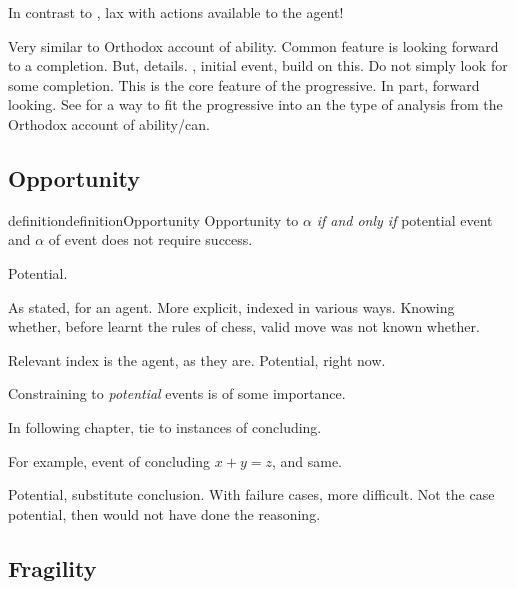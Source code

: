 \begin{note}
  In contrast to \citeauthor{Boylan:2020aa}, lax with actions available to the agent!

  Very similar to Orthodox account of ability.
  Common feature is looking forward to a completion.
  But, details.
  \citeauthor{Landman:1992wh}, initial event, build on this.
  Do not simply look for some completion.
  This is the core feature of the progressive.
  In part, forward looking.
  See \textcite{Portner:1998um} for a way to fit the progressive into an the type of analysis from the Orthodox account of ability/can.
\end{note}

\subsection{Opportunity}
\label{sec:potential}


\begin{note}
  \begin{restatable}[Opportunity]{definition}{definitionOpportunity}
    Opportunity to \(\alpha\) \emph{if and only if} potential event and \(\alpha\) of event does not require success.
  \end{restatable}
\end{note}

\begin{note}
  Potential.

  As stated, for an agent.
  More explicit, indexed in various ways.
  Knowing whether, before learnt the rules of chess, valid move was not known whether.

  Relevant index is the agent, as they are.
  Potential, right now.
\end{note}

\begin{note}[Importance]
  Constraining  to \emph{potential} events is of some importance.

  In following chapter, tie  to instances of concluding.

  For example, event of concluding \(x + y = z\), and same.

  Potential, substitute conclusion.
  With failure cases, more difficult.
  Not the case potential, then would not have done the reasoning.
\end{note}

\subsection{Fragility}
\label{sec:fragility}

